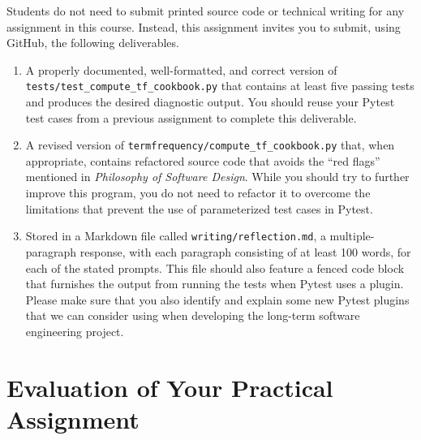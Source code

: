 \documentclass[11pt]{article}
\newcommand{\mainprogramsource}{\lstinline{termfrequency/compute_tf_cookbook.py}}
\newcommand{\testprogramsource}{\lstinline{tests/test_compute_tf_cookbook.py}}
\newcommand{\reflection}{\lstinline{writing/reflection.md}}
\newcommand{\philosophy}{{\em Philosophy of Software Design\/}}
\begin{document}
\noindent Students do not need to submit printed source code or technical
writing for any assignment in this course. Instead, this assignment invites you
to submit, using GitHub, the following deliverables.

\vspace*{-.25em}

\begin{enumerate}

\setlength{\itemsep}{0in}

\item A properly documented, well-formatted, and correct version of
  \testprogramsource{} that contains at least five passing tests and produces
  the desired diagnostic output. You should reuse your Pytest test cases from a
  previous assignment to complete this deliverable.

\item A revised version of \mainprogramsource{} that, when appropriate, contains
  refactored source code that avoids the ``red flags'' mentioned in \philosophy.
  While you should try to further improve this program, you do not need to
  refactor it to overcome the limitations that prevent the use of parameterized
  test cases in Pytest.

\item Stored in a Markdown file called \reflection{}, a multiple-paragraph
  response, with each paragraph consisting of at least 100 words, for each of
  the stated prompts. This file should also feature a fenced code block that
  furnishes the output from running the tests when Pytest uses a plugin. Please
  make sure that you also identify and explain some new Pytest plugins that we
  can consider using when developing the long-term software engineering project.

\end{enumerate}

\vspace*{-1em}

\section*{Evaluation of Your Practical Assignment}
\end{document}
